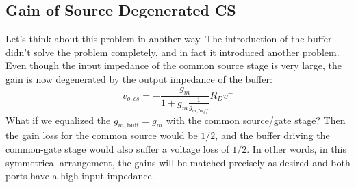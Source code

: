 \subsection{Gain of Source Degenerated CS}
Let's think about this problem in another way.   The introduction of the buffer didn't solve the problem completely, and in fact it introduced another problem.  Even though the input impedance of the common source stage is very large, the gain is now degenerated by the output impedance of the buffer:   
\begin{equation}
	v_{o,cs} = -\frac{g_m}{1+g_m \frac{1}{g_{m,buff}} } R_D v^-    
\end{equation}
What if we equalized the $g_{m,\text{buff}} = g_m$ with the common source/gate stage?  Then the gain loss for the common source would be $1/2$, and the buffer driving the common-gate stage would also suffer a voltage loss of $1/2$.  In other words, in this symmetrical arrangement, the gains will be matched precisely as desired and both ports have a high input impedance.

